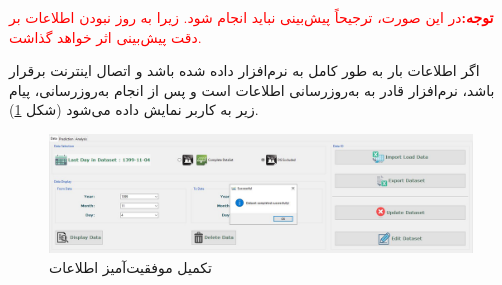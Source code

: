 \documentclass[a4paper,20pt,dvipsnames, usenames]{extbook}
\begin{document}
\textcolor{red}{\textbf{توجه:}در این صورت، ترجیحاً پیش‌بینی نباید انجام شود. زیرا به روز نبودن اطلاعات بر دقت پیش‌بینی اثر خواهد گذاشت.}

اگر اطلاعات بار به طور کامل به نرم‌افزار داده شده باشد و اتصال اینترنت برقرار باشد،‌ نرم‌افزار قادر به به‌روزرسانی اطلاعات است و پس از انجام به‌روزرسانی، پیام زیر به کاربر نمایش داده می‌شود (شکل
\ref{fig21}).
\begin{figure}[!h]
	\centering
	\includegraphics[width = \textwidth]{fig8}
	\caption{تکمیل موفقیت‌آمیز اطلاعات}
	\label{fig21}
\end{figure}
\end{document}
